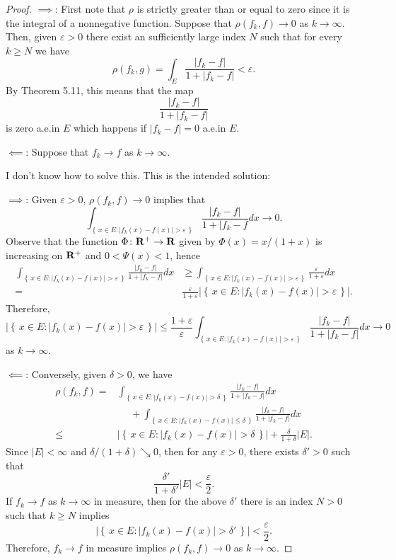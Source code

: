 \begin{proof}
$\implies$: First note that $\rho$ is strictly greater than or equal to
zero since it is the integral of a nonnegative function. Suppose that
$\rho(f_k,f)\to 0$ as $k\to\infty$. Then, given $\varepsilon>0$ there exist
an sufficiently large index $N$ such that for every $k\geq N$ we have
\begin{equation}
\label{eq:hypothesis-4}
\rho(f_k,g)=\int_E\frac{|f_k-f|}{1+|f_k-f|}<\varepsilon.
\end{equation}
By Theorem 5.11, this means that the map
\[
\frac{|f_k-f|}{1+|f_k-f|}
\]
is zero a.e.\@ in $E$ which happens if $|f_k-f|=0$ a.e.\@ in $E$.

$\impliedby$: Suppose that $f_k\to f$ as $k\to\infty$.

\bigskip

I don't know how to solve this. This is the intended solution:

$\implies$: Given $\varepsilon>0$, $\rho(f_k,f)\to 0$ implies that
\[
\int_{\left\{\,x\in
    E:|f_k(x)-f(x)|>\varepsilon\,\right\}}\frac{|f_k-f|}{1+|f_k-f} d
x\longrightarrow 0.
\]
Observe that the function $\Phi\colon\mathbf{R}^+\to\mathbf{R}$ given by
$\Phi(x)= x/(1+x)$ is increasing on $\mathbf{R}^+$ and $0<\Psi(x)<1$,
hence
\[
\begin{aligned}
  \int_{\left\{\,x\in
      E:|f_k(x)-f(x)|>\varepsilon\,\right\}}\frac{|f_k-f|}{1+|f_k-f|} d
  x
&\geq\int_{\left\{\,x\in
    E:|f_k(x)-f(x)|>\varepsilon\,\right\}}\frac{\varepsilon}{1+\varepsilon} d
x\\
={}&\frac{\varepsilon}{1+\varepsilon}
\left|\left\{\,x\in E:|f_k(x)-f(x)|>\varepsilon\,\right\}\right|.
\end{aligned}
\]
Therefore,
\[
\left|\left\{\,x\in E:|f_k(x)-f(x)|>\varepsilon\,\right\}\right|
\leq\frac{1+\varepsilon}{\varepsilon}
\int_{\left\{\,x\in
    E:|f_k(x)-f(x)|>\varepsilon\,\right\}}\frac{|f_k-f|}{1+|f_k-f|} d  x
\longrightarrow 0
\]
as $k\to\infty$.

$\impliedby$: Conversely, given $\delta>0$, we have
\[
\begin{aligned}
\rho(f_k,f)
={}&\int_{\left\{\,x\in E:|f_k(x)-f(x)|>\delta\,\right\}}\frac{|f_k-f|}{1+|f_k-f|} d  x\\
&\phantom{{}={}}+\int_{\left\{\,x\in
    E:|f_k(x)-f(x)|\leq\delta\,\right\}}\frac{|f_k-f|}{1+|f_k-f|} d  x\\
\leq{}&\left|\left\{\,x\in
    E:|f_k(x)-f(x)|>\delta\,\right\}\right|+\frac{\delta}{1+\delta}|E|.
\end{aligned}
\]
Since $|E|<\infty$ and $\delta/(1+\delta)\searrow 0$, then for any
$\varepsilon>0$, there exists $\delta'>0$ such that
\[
\frac{\delta'}{1+\delta'}|E|<\frac{\varepsilon}{2}.
\]
If $f_k\to f$ as $k\to\infty$ in measure, then for the above $\delta'$
there is an index $N>0$ such that $k\geq N$ implies
\[
\left|\left\{\,x\in E:|f_k(x)-f(x)|>\delta'\,\right\}\right|<\frac{\varepsilon}{2}.
\]
Therefore, $f_k\to f$ in measure implies $\rho(f_k,f)\to 0$ as $k\to\infty$.
\end{proof}

